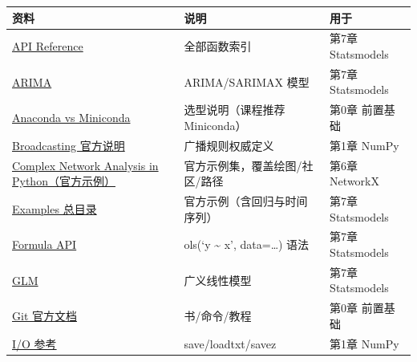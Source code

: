 {\def\LTcaptype{none} %
\begin{longtable}[]{@{}
  >{\raggedright\arraybackslash}p{}
  >{\raggedright\arraybackslash}p{}
  >{\raggedright\arraybackslash}p{}@{}}
\toprule\noalign{}
\begin{minipage}[b]{\linewidth}\raggedright
资料
\end{minipage} & \begin{minipage}[b]{\linewidth}\raggedright
说明
\end{minipage} & \begin{minipage}[b]{\linewidth}\raggedright
用于
\end{minipage} \\
\midrule\noalign{}
\endhead
\bottomrule\noalign{}
\endlastfoot
\href{https://www.statsmodels.org/stable/api.html}{API Reference} &
全部函数索引 & 第7章 Statsmodels \\
\href{https://www.statsmodels.org/stable/generated/statsmodels.tsa.arima.model.ARIMA.html}{ARIMA}
& ARIMA/SARIMAX 模型 & 第7章 Statsmodels \\
\href{https://www.anaconda.com/docs/getting-started/concepts/anaconda-or-miniconda}{Anaconda
vs Miniconda} & 选型说明（课程推荐 Miniconda） & 第0章 前置基础 \\
\href{https://numpy.org/doc/stable/user/basics.broadcasting.html}{Broadcasting
官方说明} & 广播规则权威定义 & 第1章 NumPy \\
\href{https://networkx.org/documentation/stable/auto_examples/index.html}{Complex
Network Analysis in Python（官方示例）} & 官方示例集，覆盖绘图/社区/路径
& 第6章 NetworkX \\
\href{https://www.statsmodels.org/stable/examples/index.html}{Examples
总目录} & 官方示例（含回归与时间序列） & 第7章 Statsmodels \\
\href{https://www.statsmodels.org/stable/formula.html}{Formula API} &
ols(`y \textasciitilde{} x', data=\ldots) 语法 & 第7章 Statsmodels \\
\href{https://www.statsmodels.org/stable/generated/statsmodels.genmod.generalized_linear_model.GLM.html}{GLM}
& 广义线性模型 & 第7章 Statsmodels \\
\href{https://git-scm.com/doc}{Git 官方文档} & 书/命令/教程 & 第0章
前置基础 \\
\href{https://numpy.org/doc/stable/reference/routines.io.html}{I/O 参考}
& save/loadtxt/savez & 第1章 NumPy \\

\end{longtable}}
